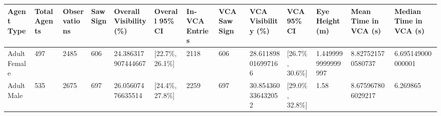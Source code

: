 \begin{tabular}{lllllllllllll}
\hline
Agent Type & Total Agents & Observations & Saw Sign & Overall Visibility (\%) & Overall 95\% CI & In-VCA Entries & VCA Saw Sign & VCA Visibility (\%) & VCA 95\% CI & Eye Height (m) & Mean Time in VCA (s) & Median Time in VCA (s) \\ \hline
Adult Female & 497 & 2485 & 606 & 24.386317907444667 & [22.7\%, 26.1\%] & 2118 & 606 & 28.611898016997166 & [26.7\%, 30.6\%] & 1.4499999999999997 & 8.827521570580737 & 6.695149000000001 \\
Adult Male & 535 & 2675 & 697 & 26.05607476635514 & [24.4\%, 27.8\%] & 2259 & 697 & 30.854360336432052 & [29.0\%, 32.8\%] & 1.58 & 8.675967806029217 & 6.269865 \\
\hline
\end{tabular}

